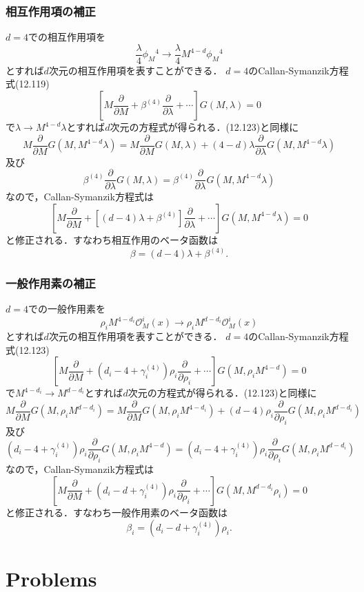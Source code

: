 \subsubsection{相互作用項の補正}
$d = 4$での相互作用項を
\[ \frac{\lambda}{4} \phi_M{}^4 \to \frac{\lambda}{4} M^{4-d} \phi_M{}^4 \]
とすれば$d$次元の相互作用項を表すことができる．
$d = 4$のCallan-Symanzik方程式(12.119)
\[
\left[ M \frac{\partial}{\partial M} + \beta^{(4)} \frac{\partial}{\partial\lambda} + \cdots \right] G(M, \lambda) = 0
\]
で$\lambda \to M^{4-d} \lambda$とすれば$d$次元の方程式が得られる．(12.123)と同様に
\[
M \frac{\partial}{\partial M} G(M, M^{4-d} \lambda)
= M \frac{\partial}{\partial M} G(M, \lambda) + (4 - d) \lambda \frac{\partial}{\partial\lambda} G(M, M^{4-d} \lambda)
\]
及び
\[
\beta^{(4)} \frac{\partial}{\partial\lambda} G(M, \lambda)
= \beta^{(4)} \frac{\partial}{\partial\lambda} G(M, M^{4-d} \lambda)
\]
なので，Callan-Symanzik方程式は
\[
\left[ M \frac{\partial}{\partial M} + [(d - 4) \lambda + \beta^{(4)}] \frac{\partial}{\partial\lambda} + \cdots \right] G(M, M^{4-d} \lambda) = 0
\]
と修正される．すなわち相互作用のベータ函数は
\[ \beta = (d - 4) \lambda + \beta^{(4)} . \]

\subsubsection{一般作用素の補正}
$d = 4$での一般作用素を
\[ \rho_i M^{4-d_i} \mathcal{O}_M^i(x) \to \rho_i M^{d-d_i} \mathcal{O}_M^i(x) \]
とすれば$d$次元の相互作用項を表すことができる．
$d = 4$のCallan-Symanzik方程式(12.123)
\[
\left[ M \frac{\partial}{\partial M} + (d_i - 4 + \gamma_i^{(4)}) \rho_i \frac{\partial}{\partial\rho_i} + \cdots \right] G(M, \rho_i M^{4-d}) = 0
\]
で$M^{4-d_i} \to M^{d-d_i}$とすれば$d$次元の方程式が得られる．(12.123)と同様に
\[
M \frac{\partial}{\partial M} G(M, \rho_i M^{d-d_i})
= M \frac{\partial}{\partial M} G(M, \rho_i M^{4-d_i}) + (d - 4) \rho_i \frac{\partial}{\partial\rho_i} G(M, \rho_i M^{d-d_i})
\]
及び
\[
(d_i - 4 + \gamma_i^{(4)}) \rho_i \frac{\partial}{\partial\rho_i} G(M, \rho_i M^{4-d})
= (d_i - 4 + \gamma_i^{(4)}) \rho_i \frac{\partial}{\partial\rho_i} G(M, \rho_i M^{d-d_i})
\]
なので，Callan-Symanzik方程式は
\[
\left[ M \frac{\partial}{\partial M} + (d_i - d + \gamma_i^{(4)}) \rho_i \frac{\partial}{\partial\rho_i} + \cdots \right] G(M, M^{d-d_i} \rho_i) = 0
\]
と修正される．すなわち一般作用素のベータ函数は
\[ \beta_i = (d_i - d + \gamma_i^{(4)}) \rho_i . \]

\section*{Problems}
